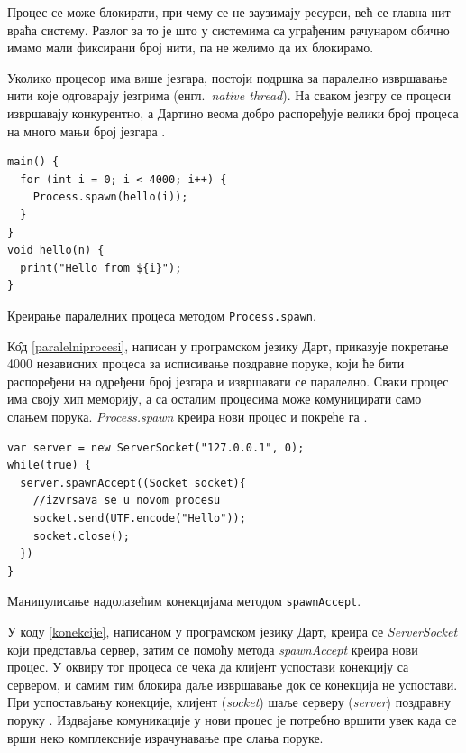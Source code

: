 \documentclass[12pt,oneside]{memoir}
\begin{document}
Процес се може блокирати, при чему се не заузимају ресурси, већ се главна нит враћа систему. Разлог за то је што у системима са уграђеним рачунаром обично имамо мали фиксирани број нити, па не желимо да их блокирамо. 

Уколико процесор има више језгара, постоји подршка за паралелно извршавање нити које одговарају језгрима (енгл.~\textit{native thread}). На сваком језгру се процеси извршавају конкурентно, а Дартино веома добро распоређује велики број процеса на много мањи број језгара \cite{Dartino}.

\begin{listing}
\begin{verbatim}
main() {
  for (int i = 0; i < 4000; i++) {
    Process.spawn(hello(i));
  }
}
void hello(n) {
  print("Hello from ${i}");
}
\end{verbatim}
\caption{Креирање паралелних процеса методом \texttt{Process.spawn}.}
\label{paralelniprocesi}
\end{listing}

К\^{о}д \ref{paralelniprocesi}, написан у програмском језику Дарт, приказује покретање 4000 независних процеса за исписивање поздравне поруке, који ће бити распоређени на одређени број језгара и извршавати се паралелно. Сваки процес има своју хип меморију, а са осталим процесима може комуницирати само слањем порука. \textit{Process.spawn} креира нови процес и покреће га \cite{procesi_i_izolate}.

\begin{listing}
\begin{verbatim}
var server = new ServerSocket("127.0.0.1", 0);
while(true) {
  server.spawnAccept((Socket socket){
	//izvrsava se u novom procesu
	socket.send(UTF.encode("Hello"));
	socket.close();
  })
}
\end{verbatim}
\caption{Манипулисање надолазећим конекцијама методом \texttt{spawnAccept}.}
\label{konekcije}
\end{listing}

У коду \ref{konekcije}, написаном у програмском језику Дарт, креира се \textit{ServerSocket} који представља сервер, затим се помоћу метода \textit{spawnAccept} креира нови процес. У оквиру тог процеса се чека да клијент успостави конекцију са сервером, и самим тим блокира даље извршавање док се конекција не успостави. При успостављању конекције, клијент (\textit{socket}) шаље серверу (\textit{server}) поздравну поруку \cite{Dartino}. Издвајање комуникације у нови процес је потребно вршити увек када се врши неко комплексније израчунавање пре слања поруке.
\end{document}
